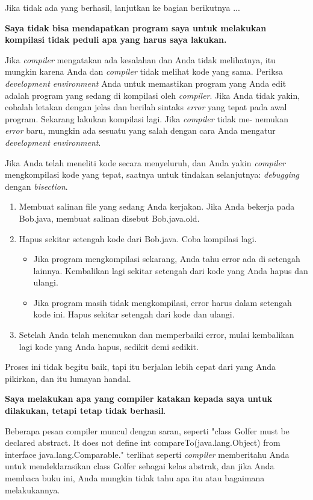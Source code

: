 \documentclass[12pt,b5paper,openright,twoside]{book}
\begin{document}
\noindent Jika tidak ada yang berhasil, lanjutkan ke bagian berikutnya ...

\noindent \textbf{Saya tidak bisa mendapatkan program saya untuk melakukan kompilasi tidak peduli apa yang harus saya lakukan.}

\noindent Jika \textit{compiler} mengatakan ada kesalahan dan Anda tidak melihatnya, itu mungkin karena Anda dan \textit{compiler} tidak melihat kode yang sama. Periksa \textit{development environment} Anda untuk memastikan program yang Anda edit adalah program yang sedang di kompilasi oleh \textit{compiler}. Jika Anda tidak yakin, cobalah letakan dengan jelas dan berilah sintaks \textit{error} yang tepat pada awal program. Sekarang lakukan kompilasi lagi. Jika \textit{compiler} tidak me- nemukan \textit{error} baru, mungkin ada sesuatu yang salah dengan cara Anda mengatur \textit{development environment}.

\noindent Jika Anda telah meneliti kode secara menyeluruh, dan Anda yakin \textit{compiler} mengkompilasi kode yang tepat, saatnya untuk tindakan selanjutnya: \textit{debugging} dengan \textit{bisection}.
\begin{enumerate}
    \item Membuat salinan file yang sedang Anda kerjakan. Jika Anda bekerja pada Bob.java, membuat salinan disebut Bob.java.old.
    \item Hapus sekitar setengah kode dari Bob.java. Coba kompilasi lagi.
    \begin{itemize}
        \item Jika program mengkompilasi sekarang, Anda tahu error ada di setengah lainnya. Kembalikan lagi sekitar setengah dari kode yang Anda hapus dan ulangi.
        \item Jika program masih tidak mengkompilasi, error harus dalam setengah kode ini. Hapus sekitar setengah dari kode dan ulangi.
    \end{itemize}
    \item Setelah Anda telah menemukan dan memperbaiki error, mulai kembalikan lagi kode yang Anda hapus, sedikit demi sedikit.
\end{enumerate}

\noindent Proses ini tidak begitu baik, tapi itu berjalan lebih cepat dari yang Anda pikirkan, dan itu lumayan handal.

\noindent \textbf{Saya melakukan apa yang compiler katakan kepada saya untuk dilakukan, tetapi tetap tidak berhasil}.

\noindent Beberapa pesan compiler muncul dengan saran, seperti "class Golfer must be declared abstract. It does not define int compareTo(java.lang.Object) from interface java.lang.Comparable." terlihat seperti \textit{compiler} memberitahu Anda untuk mendeklarasikan class Golfer sebagai kelas abstrak, dan jika Anda membaca buku ini, Anda mungkin tidak tahu apa itu atau bagaimana melakukannya.
\end{document}

